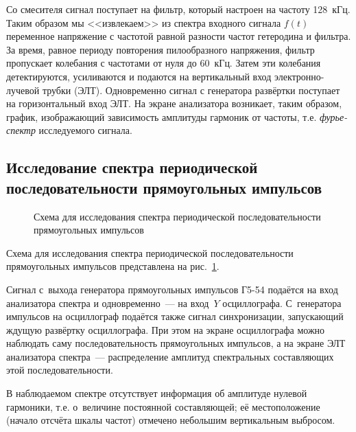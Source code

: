 Со смесителя сигнал поступает на фильтр, который настроен на частоту 128~кГц. Таким образом мы <<извлекаем>> из спектра входного  сигнала $f(t)$ переменное напряжение с частотой равной разности частот гетеродина и фильтра. За время, равное периоду повторения пилообразного напряжения, фильтр пропускает колебания с частотами от нуля до 60~кГц. Затем эти колебания детектируются, усиливаются и подаются на вертикальный вход электронно-лучевой трубки (ЭЛТ). Одновременно сигнал с генератора развёртки поступает на горизонтальный вход ЭЛТ. На экране анализатора возникает, таким образом, график, изображающий зависимость амплитуды гармоник от частоты, т.е. \emph{фурье-спектр} исследуемого сигнала.

\subsection*{Исследование спектра периодической последовательности прямоугольных импульсов}


\begin{figure}[h]
	\hfill
	\hspace*{\fill}
	\label{fig:612}
	\caption{Схема для исследования спектра периодической последовательности прямоугольных импульсов}
\end{figure}

\experiment
Схема для исследования спектра периодической последовательности прямоугольных импульсов представлена на рис.~\ref{fig:612}.

Сигнал с~выхода генератора прямоугольных импульсов Г5-54 подаётся на вход анализатора спектра и одновременно~--- на вход~$Y$ осциллографа. С~генератора импульсов на осциллограф подаётся также сигнал синхронизации, запускающий ждущую развёртку осциллографа. При этом на экране осциллографа можно наблюдать саму последовательность прямоугольных импульсов, а на экране ЭЛТ анализатора спектра~--- распределение амплитуд спектральных составляющих этой последовательности.

В наблюдаемом спектре отсутствует информация об амплитуде нулевой гармоники, т.е. о~величине постоянной составляющей; её местоположение (начало отсчёта шкалы частот) отмечено небольшим вертикальным выбросом.


